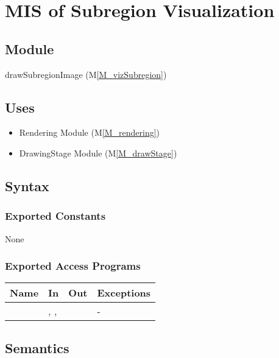 \documentclass[12pt, titlepage]{article}
\newcommand{\mref}[1]{M\ref{#1}}
\newcommand{\mrefp}[1]{(\mref{#1})}
\newcommand{\mreff}[1]{Module \mrefp{#1}}
\begin{document}
\newpage



\section{MIS of Subregion Visualization} \label{MS_vizSubregion}

\subsection{Module}
drawSubregionImage \mrefp{M_vizSubregion}

\subsection{Uses}
\begin{itemize}
  \item Rendering \mreff{M_rendering}
  \item DrawingStage \mreff{M_drawStage}
\end{itemize}

\subsection{Syntax}

\subsubsection{Exported Constants}
None
\subsubsection{Exported Access Programs}

\begin{center}
\begin{tabular}{L{5cm} L{4cm} L{4cm} L{2cm}}
\hline
\textbf{Name} & \textbf{In} & \textbf{Out} & \textbf{Exceptions} \\
\hline
{} & , , 
  &  & - \\
\hline
\end{tabular}
\end{center}

\subsection{Semantics}
\end{document}
